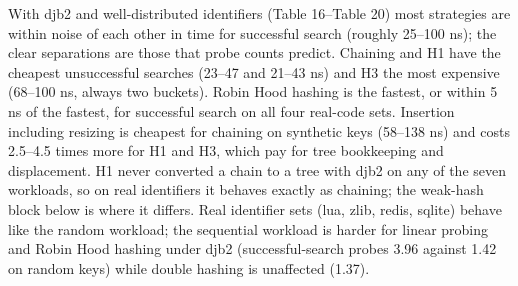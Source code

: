 \documentclass{ieeeaccess}
\begin{document}
\begin{table}[!t]
\caption{Experiment B, djb2: Eq. (7) scope cost in ns per scope operation (name@depth design).}
\label{tab:20}
\centering
\scriptsize
{}
\end{table}


With djb2 and well-distributed identifiers (Table 16--Table 20) most strategies are within noise of each other in time for successful search (roughly 25--100 ns); the clear separations are those that probe counts predict. Chaining and H1 have the cheapest unsuccessful searches (23--47 and 21--43 ns) and H3 the most expensive (68--100 ns, always two buckets). Robin Hood hashing is the fastest, or within 5 ns of the fastest, for successful search on all four real-code sets. Insertion including resizing is cheapest for chaining on synthetic keys (58--138 ns) and costs 2.5--4.5 times more for H1 and H3, which pay for tree bookkeeping and displacement. H1 never converted a chain to a tree with djb2 on any of the seven workloads, so on real identifiers it behaves exactly as chaining; the weak-hash block below is where it differs. Real identifier sets (lua, zlib, redis, sqlite) behave like the random workload; the sequential workload is harder for linear probing and Robin Hood hashing under djb2 (successful-search probes 3.96 against 1.42 on random keys) while double hashing is unaffected (1.37).
\end{document}
